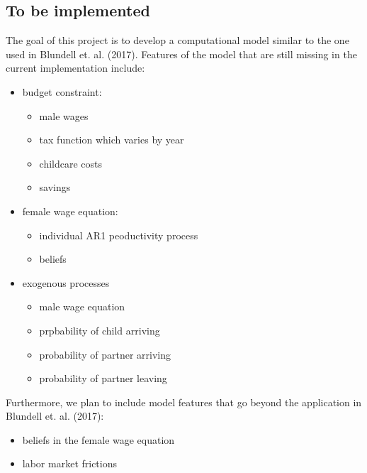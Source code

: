 \documentclass[letterpaper,10pt,english]{sphinxmanual}
\begin{document}
\subsection{To be implemented}
\label{\detokenize{computational_model:to-be-implemented}}
The goal of this project is to develop a computational model similar to the one used in Blundell et. al. (2017). Features of the model that are still missing in the current implementation include:
\begin{itemize}
\item {} 
budget constraint:
\begin{itemize}
\item {} 
male wages

\item {} 
tax function which varies by year

\item {} 
childcare costs

\item {} 
savings

\end{itemize}

\item {} 
female wage equation:
\begin{itemize}
\item {} 
individual AR1 peoductivity process

\item {} 
beliefs

\end{itemize}

\item {} 
exogenous processes
\begin{itemize}
\item {} 
male wage equation

\item {} 
prpbability of child arriving

\item {} 
probability of partner arriving

\item {} 
probability of partner leaving

\end{itemize}

\end{itemize}

Furthermore, we plan to include model features that go beyond the application in Blundell et. al. (2017):
\begin{itemize}
\item {} 
beliefs in the female wage equation

\item {} 
labor market frictions

\end{itemize}
\end{document}
